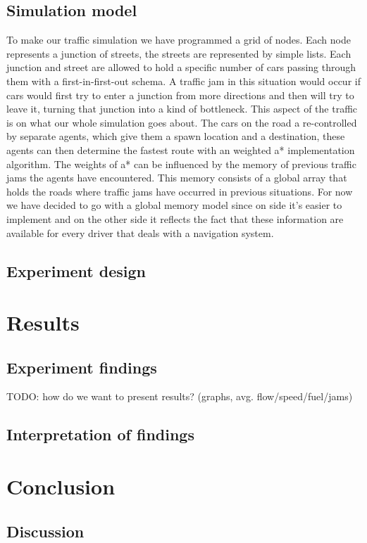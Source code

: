\documentclass[a4paper,hidelinks]{article}
\begin{document}
\subsection{Simulation model}
To make our traffic simulation we have programmed a grid of nodes. Each node represents a junction of streets, the streets are represented by simple lists. Each junction and street are allowed to hold a specific number of cars passing through them with a first-in-first-out schema. A traffic jam in this situation would occur if cars would first try to enter a junction from more directions and then will try to leave it, turning that junction into a kind of bottleneck. This aspect of the traffic is on what our whole simulation goes about. The cars on the road a re-controlled by separate agents, which give them a spawn location and a destination, these agents can then determine the fastest route with an weighted a* implementation algorithm. The weights of a* can be influenced by the memory of previous traffic jams the agents have encountered. This memory consists of a global array that holds the roads where traffic jams have occurred in previous situations. For now we have decided to go with a global memory model since on side it's easier to implement and on the other side it reflects the fact that these information are available for every driver that deals with a navigation system. 

\subsection{Experiment design}


\section{Results}
\subsection{Experiment findings}
TODO: how do we want to present results? (graphs, avg. flow/speed/fuel/jams)

\subsection{Interpretation of findings}


\section{Conclusion}
\subsection{Discussion}
\end{document}
